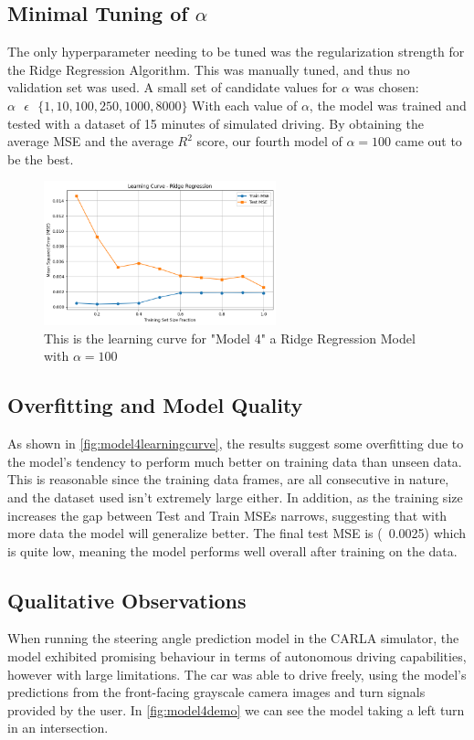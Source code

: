 \documentclass{article} %
\begin{document}
\subsection{Minimal Tuning of $\alpha$}
The only hyperparameter needing to be tuned was the regularization strength for the Ridge Regression Algorithm. This was manually tuned,
and thus no validation set was used. A small set of candidate values for $\alpha$ was chosen: $\alpha \text{ } \epsilon \text{ } 
\{ 1, 10, 100, 250, 1000, 8000\}$ With each value of $\alpha$, the model was trained and tested with a dataset of 15 minutes of simulated
driving. By obtaining the average MSE and the average $R^2$ score, our fourth model of $\alpha = 100$ came out to be the best. 


\begin{figure}[H] %
    \centering
    \includegraphics[width=0.6\textwidth]{model4learningcurve.png} %
    \caption{This is the learning curve for "Model 4" a Ridge Regression Model with $\alpha = 100$}
    \label{fig:model4learningcurve}
\end{figure}

\subsection{Overfitting and Model Quality}
As shown in \autoref{fig:model4learningcurve}, the results suggest some overfitting due to the model's tendency
to perform much better on training data than unseen data. This is reasonable since the training data frames, 
are all consecutive in nature, and the dataset used isn't extremely large either. In addition, as the training size
increases the gap between Test and Train MSEs narrows, suggesting that with more data the model will generalize better. 
The final test MSE is (~0.0025) which is quite low, meaning the model performs well overall after training on the data.


\subsection{Qualitative Observations}
When running the steering angle prediction model in the CARLA simulator, the model exhibited promising behaviour in terms of
autonomous driving capabilities, however with large limitations. The car was able to drive freely, using the model's predictions
from the front-facing grayscale camera images and turn signals provided by the user. In \autoref{fig:model4demo} we can see
the model taking a left turn in an intersection.
\end{document}
